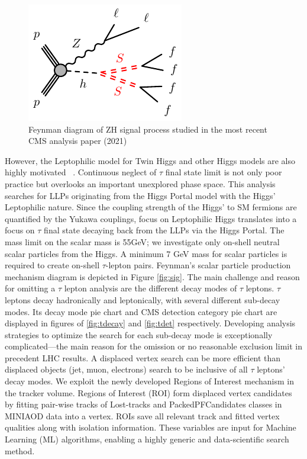 \begin{figure}[h!]
  \caption{Feynman diagram of ZH signal process studied in the most recent CMS analysis paper (2021) \cite{ZHAN}}
  \label{fig:ZHfeyn}
  \centering
  \includegraphics[width=0.47\linewidth]{figs/Zh-llffff-SS.pdf}
\end{figure}


However, the Leptophilic model for Twin Higgs and other Higgs models are also highly motivated ~\cite{Lepto}. Continuous neglect of $\tau$ final state limit is not only poor practice but overlooks an important unexplored phase space.
This analysis searches for LLPs originating from the Higgs Portal model with the Higgs' Leptophilic nature.
Since the coupling strength of the Higgs' to SM fermions are quantified by the Yukawa couplings, focus on Leptophilic Higgs translates into a focus on $\tau$ final state decaying back from the LLPs via the Higgs Portal.
The mass limit on the scalar mass is 55GeV; we investigate only on-shell neutral scalar particles from the Higgs.
A minimum 7 GeV mass for scalar particles is required to create on-shell $\tau$-lepton pairs.
Feynman's scalar particle production mechanism diagram is depicted in Figure \ref{fig:sig}.
The main challenge and reason for omitting a $\tau$ lepton analysis are the different decay modes of $\tau$ leptons.
$\tau$ leptons decay hadronically and leptonically, with several different sub-decay modes.
Its decay mode pie chart and CMS detection category pie chart are displayed in figures of \ref{fig:tdecay} and \ref{fig:tdet} respectively.
Developing analysis strategies to optimize the search for each sub-decay mode is exceptionally complicated—the main reason for the omission or no reasonable exclusion limit in precedent LHC results.
A displaced vertex search can be more efficient than displaced objects (jet, muon, electrons) search to be inclusive of all $\tau$ leptons' decay modes.
We exploit the newly developed Regions of Interest mechanism in the tracker volume.
Regions of Interest (ROI) form displaced vertex candidates by fitting pair-wise tracks of Lost-tracks and PackedPFCandidates classes in MINIAOD data into a vertex.
ROIs save all relevant track and fitted vertex qualities along with isolation information.
These variables are input for Machine Learning (ML) algorithms, enabling a highly generic and data-scientific search method.

